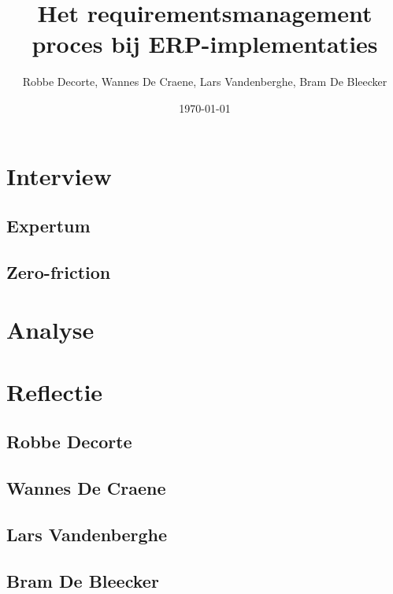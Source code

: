 \documentclass{hogent-report}
\title{Het requirementsmanagement proces bij ERP-implementaties}
\author{Robbe Decorte, Wannes {De Craene}, Lars Vandenberghe, Bram {De Bleecker}}
\date{\today}
\begin{document}
  \inserttitlepage[hgblue]
  
  \usechapterimagefalse

  \tableofcontents
  
  
  
  
  
  
  \chapter{Interview}
  
  \section{Expertum}
  
  \section{Zero-friction}
  
  \lipsum[11-15]
  
  \chapter{Analyse}
  
  \chapter{Reflectie}
  
  \section{Robbe Decorte}
  
  \section{Wannes De Craene}
  
  \section{Lars Vandenberghe}
  
  \section{Bram De Bleecker}
  \autocite{Decorte1999}
  
  \printbibliography[heading=bibintoc]

  
  
\end{document}
